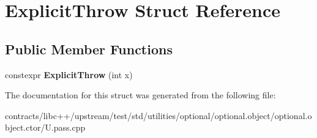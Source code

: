 \hypertarget{struct_explicit_throw}{}\section{Explicit\+Throw Struct Reference}
\label{struct_explicit_throw}
\subsection*{Public Member Functions}
\begin{DoxyCompactItemize}
\item 
\mbox{\label{struct_explicit_throw_a43cb5e52690bb5ee43f03b834919c09d}} 
constexpr {\bfseries Explicit\+Throw} (int x)
\end{DoxyCompactItemize}


The documentation for this struct was generated from the following file\+:\begin{DoxyCompactItemize}
\item 
contracts/libc++/upstream/test/std/utilities/optional/optional.\+object/optional.\+object.\+ctor/U.\+pass.\+cpp\end{DoxyCompactItemize}

